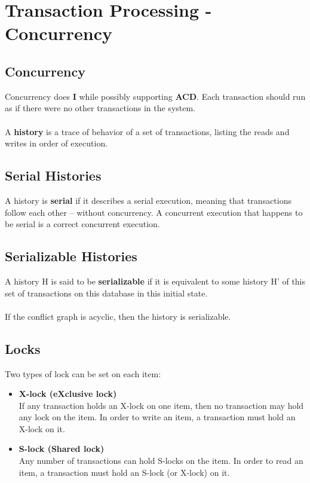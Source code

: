 \documentclass{article}
\begin{document}
\section{Transaction Processing - Concurrency}
\subsection{Concurrency}
Concurrency does \textbf{I} while possibly supporting \textbf{ACD}. Each transaction should run as if there were no other transactions in the system. \\ \\
A \textbf{history} is a trace of behavior of a set of transactions, listing the reads and writes in order of execution.

\subsection{Serial Histories}
A history is \textbf{serial} if it describes a serial execution, meaning that transactions follow each other -- without concurrency. A concurrent execution that happens to be serial is a correct concurrent execution.

\subsection{Serializable Histories}
A history H is said to be \textbf{serializable} if it is equivalent to some history H' of this set of transactions on this database in this initial state. \\ \\
If the conflict graph is acyclic, then the history is serializable.

\subsection{Locks}
Two types of lock can be set on each item:

\begin{itemize}
	\item \textbf{X-lock (eXclusive lock)}
	\vspace{.2cm} \\
	If any transaction holds an X-lock on one item, then no transaction may hold any lock on the item. In order to write an item, a transaction must hold an X-lock on it.
	
	\item \textbf{S-lock (Shared lock)}
	\vspace{.2cm} \\
	Any number of transactions can hold S-locks on the item. In order to read an item, a transaction must hold an S-lock (or X-lock) on it.
\end{itemize}
\end{document}
